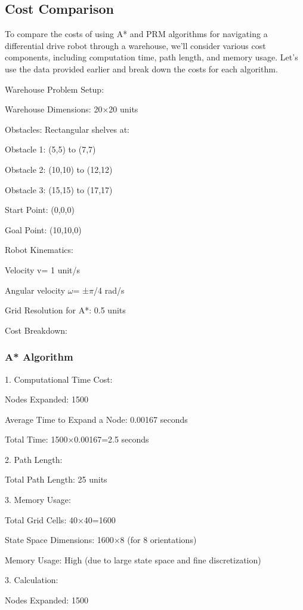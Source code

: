 \documentclass[9pt,a4paper,twoside]{rho-class/rho}
\begin{document}
    \subsection{Cost Comparison}
    To compare the costs of using A* and PRM algorithms for navigating a differential drive robot through a warehouse, we'll consider various cost components, including computation time, path length, and memory usage. Let's use the data provided earlier and break down the costs for each algorithm.

    Warehouse Problem Setup:

    Warehouse Dimensions: 20×20 units

    Obstacles: Rectangular shelves at:

    Obstacle 1: (5,5) to (7,7)

    Obstacle 2: (10,10) to (12,12)

    Obstacle 3: (15,15) to (17,17)

    Start Point: (0,0,0)

    Goal Point: (10,10,0)

    Robot Kinematics:

    Velocity v= 1 unit/s

    Angular velocity $\omega$= ±$\pi$/4 rad/s

    Grid Resolution for A*: 0.5 units

    Cost Breakdown:

    \subsubsection{A* Algorithm}

    1. Computational Time Cost:

    Nodes Expanded: 1500

    Average Time to Expand a Node: 0.00167 seconds

    Total Time: 1500×0.00167=2.5 seconds

    2. Path Length:

    Total Path Length: 25 units

    3. Memory Usage:

    Total Grid Cells: 40×40=1600

    State Space Dimensions: 1600×8 (for 8 orientations)

    Memory Usage: High (due to large state space and fine discretization)

    3. Calculation:

    Nodes Expanded: 1500
\end{document}
